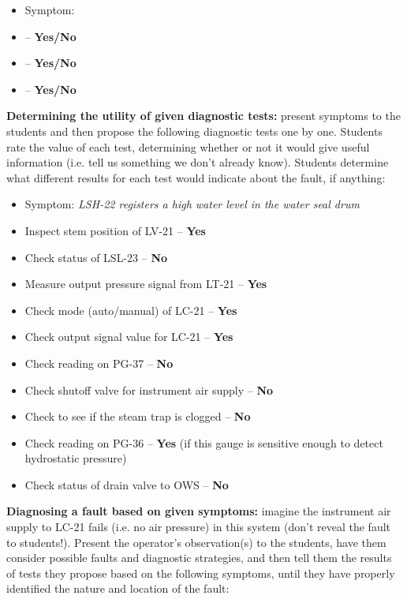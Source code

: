 \begin{itemize}
\item{} Symptom: {\it }
\item{}  -- {\bf Yes/No}
\item{}  -- {\bf Yes/No}
\item{}  -- {\bf Yes/No}
\end{itemize}


\vskip 10pt


\noindent
{\bf Determining the utility of given diagnostic tests:} present symptoms to the students and then propose the following diagnostic tests one by one.  Students rate the value of each test, determining whether or not it would give useful information (i.e. tell us something we don't already know).  Students determine what different results for each test would indicate about the fault, if anything:

\begin{itemize}
\item{} Symptom: {\it LSH-22 registers a high water level in the water seal drum}
\item{} Inspect stem position of LV-21 -- {\bf Yes}
\item{} Check status of LSL-23 -- {\bf No}
\item{} Measure output pressure signal from LT-21 -- {\bf Yes} 
\item{} Check mode (auto/manual) of LC-21 -- {\bf Yes}
\item{} Check output signal value for LC-21 -- {\bf Yes}
\item{} Check reading on PG-37 -- {\bf No}
\item{} Check shutoff valve for instrument air supply -- {\bf No}
\item{} Check to see if the steam trap is clogged -- {\bf No}
\item{} Check reading on PG-36 -- {\bf Yes} (if this gauge is sensitive enough to detect hydrostatic pressure)
\item{} Check status of drain valve to OWS -- {\bf No}
\end{itemize}


\vskip 10pt


\noindent
{\bf Diagnosing a fault based on given symptoms:} imagine the instrument air supply to LC-21 fails (i.e. no air pressure) in this system (don't reveal the fault to students!).  Present the operator's observation(s) to the students, have them consider possible faults and diagnostic strategies, and then tell them the results of tests they propose based on the following symptoms, until they have properly identified the nature and location of the fault:

